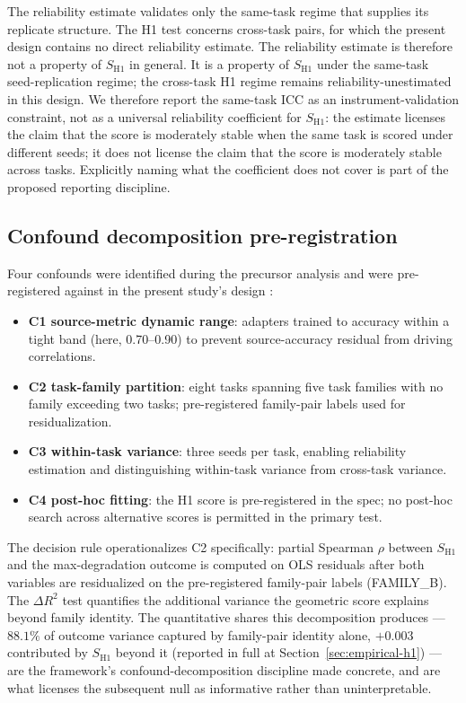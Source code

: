 \documentclass[10pt]{article}
\begin{document}
The reliability estimate validates only the same-task regime that
supplies its replicate structure. The H1 test concerns cross-task
pairs, for which the present design contains no direct reliability
estimate. The reliability estimate is therefore not a property of
$S_{\mathrm{H1}}$ in general. It is a property of $S_{\mathrm{H1}}$
under the same-task seed-replication regime; the cross-task H1
regime remains reliability-unestimated in this design. We
therefore report the same-task ICC as an instrument-validation
constraint, not as a universal reliability coefficient for
$S_{\mathrm{H1}}$: the estimate licenses the claim that the score
is moderately stable when the same task is scored under different
seeds; it does not license the claim that the score is moderately
stable across tasks. Explicitly naming what the coefficient does
not cover is part of the proposed reporting discipline.

\subsection{Confound decomposition pre-registration}

Four confounds were identified during the precursor analysis and
were pre-registered against in the present study's design
\citep{anonymized2026prereg}:
\begin{itemize}
  \item \textbf{C1 source-metric dynamic range}: adapters trained to
    accuracy within a tight band (here, 0.70--0.90) to prevent
    source-accuracy residual from driving correlations.
  \item \textbf{C2 task-family partition}: eight tasks spanning five
    task families with no family exceeding two tasks; pre-registered
    family-pair labels used for residualization.
  \item \textbf{C3 within-task variance}: three seeds per task,
    enabling reliability estimation and distinguishing within-task
    variance from cross-task variance.
  \item \textbf{C4 post-hoc fitting}: the H1 score is pre-registered
    in the spec; no post-hoc search across alternative scores is
    permitted in the primary test.
\end{itemize}
The decision rule operationalizes C2 specifically: partial Spearman
$\rho$ between $S_{\mathrm{H1}}$ and the max-degradation outcome is
computed on OLS residuals after both variables are residualized on
the pre-registered family-pair labels (FAMILY\_B). The $\Delta R^2$
test quantifies the additional variance the geometric score explains
beyond family identity. The quantitative shares this decomposition
produces --- $88.1\%$ of outcome variance captured by family-pair
identity alone, $+0.003$ contributed by $S_{\mathrm{H1}}$ beyond it
(reported in full at Section~\ref{sec:empirical-h1}) --- are the
framework's confound-decomposition discipline made concrete, and are
what licenses the subsequent null as informative rather than
uninterpretable.
\end{document}
